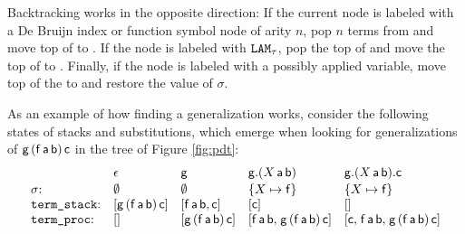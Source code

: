 Backtracking works in the opposite direction: If the current node is labeled with a De
Bruijn index or function symbol node of arity $n$, pop $n$ terms from \tstack{} and move
top of \tproc{} to \tstack{}. If the node is labeled with
$\texttt{LAM}_\tau$, pop the top of \tstack{} and move the top of \tproc{} to
\tstack{}. Finally, if the node is labeled with a possibly applied variable, move top of the
\tproc{} to \tstack{} and restore the value of $\sigma$.

As an example of how finding a generalization works, consider the following
states of stacks and substitutions, which emerge when looking for generalizations of 
$\mathsf{g} \, (\mathsf{f} \, \mathsf{a} \, \mathsf{b}) \, \mathsf{c}$ in the tree of Figure \ref{fig:pdt}:
%
\[\begin{array}{@{}l@{\kern1em}l@{\kern1em}l@{\kern1em}l@{\kern1em}l@{}}
             & \epsilon                                                & \cst{g}                                                 & \cst{g}.(X \, \cst{a} \, \cst{b})                                                          & \cst{g}.(X \, \cst{a} \, \cst{b}).\cst{c} \\[.5\jot]
  \sigma{:}  & \emptyset                                               & \emptyset                                               & \{X \mapsto \cst{f}\}                                                                      & \{X \mapsto \cst{f}\} \\
  \tstack{:} & [\cst{g} \, (\cst{f} \, \cst{a} \, \cst{b}) \, \cst{c}] & [\cst{f} \, \cst{a} \, \cst{b}, \cst{c}]                & [\cst{c}]                                                                                  & [] \\
  \tproc{:}  & []                                                      & [\cst{g} \, (\cst{f} \, \cst{a} \, \cst{b}) \, \cst{c}] & [\cst{f} \, \cst{a} \, \cst{b}{,}\; \cst{g} \, (\cst{f} \, \cst{a} \, \cst{b}) \, \cst{c}] & [\cst{c}{,}\;\cst{f} \, \cst{a} \, \cst{b}{,}\; \cst{g} \, (\cst{f} \, \cst{a} \, \cst{b}) \, \cst{c}]
  \end{array}\]
%




  

  
  

